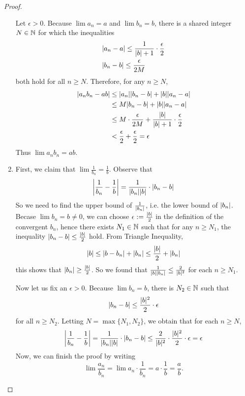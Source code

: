 \begin{proof}
\begin{enumerate}
      Let $\epsilon>0$. Because $\lim a_n=a$ and $\lim b_n=b$, there is
      a shared integer $N\in\N$ for which the inequalities
      \begin{align*}
        &\abs{a_n-a}\leq\frac{1}{\abs{b}+1}\cdot\frac{\epsilon}{2}\\
        &\abs{b_n-b}\leq\frac{\epsilon}{2M}
      \end{align*}
      both hold for all $n\geq N$. Therefore, for any $n\geq N$,
      \begin{align*}
        \abs{a_nb_n-ab}
        &\leq\abs{a_n}\abs{b_n-b}+\abs{b}\abs{a_n-a}\\
        &\leq M\abs{b_n-b}+\abs{b}\abs{a_n-a}\\
        &\leq M\cdot\frac{\epsilon}{2M}+\frac{\abs{b}}{\abs{b}+1}\cdot\frac{\epsilon}{2}\\
        &< \frac{\epsilon}{2}+\frac{\epsilon}{2}=\epsilon
      \end{align*}
      Thus $\boxed{\lim a_nb_n=ab.}$

    \item First, we claim that $\lim\frac{1}{b_n}=\frac{1}{b}$. 
      Observe that
      \[
        \abs*{\frac{1}{b_n}-\frac{1}{b}}
        =\frac{1}{\abs{b_n}\abs{b}}\cdot\abs{b_n-b}
      \]
      So we need to find the upper bound of $\frac{1}{\abs{b_n}}$, i.e.
      the lower bound of $\abs{b_n}$.
      Becase $\lim b_n=b\neq 0$, we can choose $\epsilon:=\frac{\abs{b}}{2}$
      in the definition of the convergent $b_n$, hence there exists 
      $N_1\in\N$ such that for any $n\geq N_1$, the inequality 
      $\abs{b_n-b}\leq \frac{\abs{b}}{2}$ hold. From Triangle Inequality,
      \[
        \abs{b}\leq \abs{b-b_n}+\abs{b_n}\leq\frac{\abs{b}}{2}+\abs{b_n}
      \]
      this shows that $\abs{b_n}\geq \frac{\abs{b}}{2}$. So we found that
      $\frac{1}{\abs{b}\abs{b_n}}\leq\frac{2}{\abs{b}^2}$ for each 
      $n\geq N_1$.

      \quad Now let us fix an $\epsilon>0$. Because $\lim b_n=b$, 
      there is $N_2\in\N$ such that 
      \[
        \abs{b_n-b}\leq\frac{\abs{b}^2}{2}\cdot\epsilon
      \]
      for all $n\geq N_2$. Letting $N=\max\{N_1,N_2\}$, we obtain that
      for each $n\geq N$,
      \[
        \abs*{\frac{1}{b_n}-\frac{1}{b}}
        =\frac{1}{\abs{b_n}\abs{b}}\cdot\abs{b_n-b}\\
        \leq \frac{2}{\abs{b}^2}\cdot\frac{\abs{b}^2}{2}\cdot\epsilon
        =\epsilon
      \]
      Now, we can finish the proof by writing
      \[
        \lim\frac{a_n}{b_n}=\lim a_n\cdot\frac{1}{b_n}=a\cdot\frac{1}{b}=
        \frac{a}{b}.
      \]
  \end{enumerate}
\end{proof}
